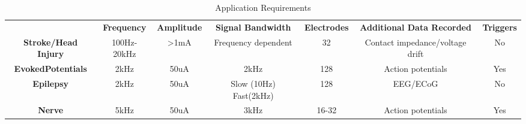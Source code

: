 \begin{table} 
    \begin{tabular}{ c c c c c c c }
         & \textbf{Frequency} & \textbf{Amplitude} & \textbf{Signal Bandwidth} & \textbf{Electrodes} & \textbf{Additional Data Recorded} & \textbf{Triggers} \\ 
        \textbf{Stroke/Head Injury} & 100Hz-20kHz & >1mA & Frequency dependent & 32 & Contact impedance/voltage drift & No \\ 
        \textbf{EvokedPotentials} & 2kHz & 50uA & 2kHz & 128 & Action potentials & Yes \\ 
        \textbf{Epilepsy} & 2kHz & 50uA & Slow (10Hz) Fast(2kHz) & 128 & EEG/ECoG & No \\ 
        \textbf{Nerve} & 5kHz & 50uA & 3kHz & 16-32 & Action potentials & Yes \\ 
    \end{tabular} 
    \caption{Application Requirements} 
\end{table}